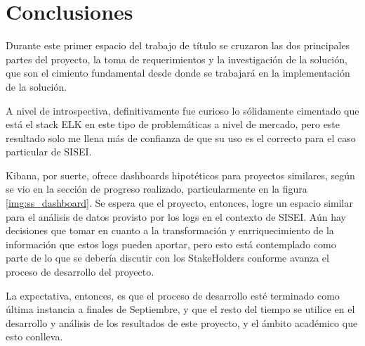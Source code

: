 \section{Conclusiones}

Durante este primer espacio del trabajo de título se cruzaron las dos principales partes del proyecto, la toma de requerimientos y la investigación de la solución, que son el cimiento fundamental desde donde se trabajará en la implementación de la solución.

A nivel de introspectiva, definitivamente fue curioso lo sólidamente cimentado que está el stack ELK en este tipo de problemáticas a nivel de mercado, pero este resultado solo me llena más de confianza de que su uso es el correcto para el caso particular de SISEI.

Kibana, por suerte, ofrece dashboards hipotéticos para proyectos similares, según se vio en la sección de progreso realizado, particularmente en la figura \ref{img:ss_dashboard}. Se espera que el proyecto, entonces, logre un espacio similar para el análisis de datos provisto por los logs en el contexto de SISEI. Aún hay decisiones que tomar en cuanto a la transformación y enrriquecimiento de la información que estos logs pueden aportar, pero esto está contemplado como parte de lo que se debería discutir con los StakeHolders conforme avanza el proceso de desarrollo del proyecto.

La expectativa, entonces, es que el proceso de desarrollo esté terminado como última instancia a finales de Septiembre, y que el resto del tiempo se utilice en el desarrollo y análisis de los resultados de este proyecto, y el ámbito académico que esto conlleva.

\clearpage
